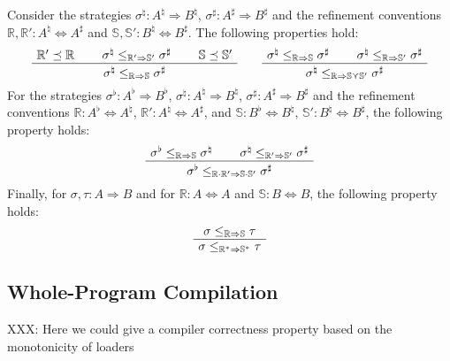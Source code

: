 \documentclass[sigplan,10pt,review,anonymous]{acmart}
\begin{document}
\begin{lemma} \label{lemma:kleenesim} %
Consider the strategies
$\sigma^\natural : A^\natural \Rightarrow B^\natural$,
$\sigma^\sharp : A^\sharp \Rightarrow B^\sharp$ and
the refinement conventions
$\mathbb{R}, \mathbb{R}' : A^\natural \Leftrightarrow A^\sharp$ and
$\mathbb{S}, \mathbb{S}' : B^\natural \Leftrightarrow B^\sharp$.
The following properties hold:
\[
  \AxiomC{$\mathbb{R}' \preceq \mathbb{R}$}
  \AxiomC{$\sigma^\natural \le_{\mathbb{R}' \Rightarrow \mathbb{S}'} \sigma^\sharp$}
  \AxiomC{$\mathbb{S} \preceq \mathbb{S}'$}
  \TrinaryInfC{$\sigma^\natural \le_{\mathbb{R} \Rightarrow \mathbb{S}} \sigma^\sharp$}
  \DisplayProof
  \qquad
  \AxiomC{$\sigma^\natural \le_{\mathbb{R} \Rightarrow \mathbb{S}} \sigma^\sharp$}
  \AxiomC{$\sigma^\natural \le_{\mathbb{R} \Rightarrow \mathbb{S}'} \sigma^\sharp$}
  \BinaryInfC{$\sigma^\natural
     \le_{\mathbb{R} \Rightarrow \mathbb{S} \curlyvee \mathbb{S}'} \sigma^\sharp$}
  \DisplayProof
\]
For the strategies
$\sigma^\flat : A^\flat \Rightarrow B^\flat$,
$\sigma^\natural : A^\natural \Rightarrow B^\natural$,
$\sigma^\sharp : A^\sharp \Rightarrow B^\sharp$ and
the refinement conventions
$\mathbb{R} : A^\flat \Leftrightarrow A^\natural$,
$\mathbb{R}' : A^\natural \Leftrightarrow A^\sharp$, and
$\mathbb{S} : B^\flat \Leftrightarrow B^\natural$,
$\mathbb{S}' : B^\natural \Leftrightarrow B^\sharp$,
the following property holds:
\[
  \AxiomC{$\sigma^\flat \le_{\mathbb{R} \Rightarrow \mathbb{S}} \sigma^\natural$}
  \AxiomC{$\sigma^\natural \le_{\mathbb{R}' \Rightarrow \mathbb{S}'} \sigma^\sharp$}
  \BinaryInfC{$\sigma^\flat
    \le_{\mathbb{R} \cdot \mathbb{R}' \Rightarrow \mathbb{S} \cdot \mathbb{S}'}
    \sigma^\sharp$}
  \DisplayProof
\]
Finally,
for
$\sigma, \tau : A \Rightarrow B$
and for
$\mathbb{R} : A \Leftrightarrow A$ and
$\mathbb{S} : B \Leftrightarrow B$,
the following property holds:
\[
  \AxiomC{$\sigma \le_{\mathbb{R} \Rightarrow \mathbb{S}} \tau$}
  \UnaryInfC{$\sigma \le_{\mathbb{R}^* \Rightarrow \mathbb{S}^*} \tau$}
  \DisplayProof
\]
\end{lemma}


\subsection{Whole-Program Compilation} \label{sec:corr:wp} %

XXX: Here we could give a compiler correctness property
based on the monotonicity of loaders
\end{document}
